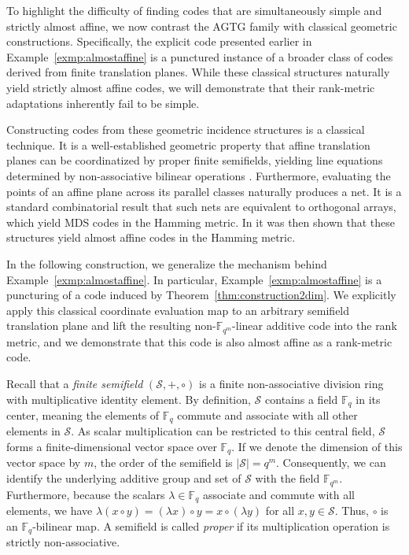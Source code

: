 \documentclass[a4paper,11pt,reqno]{article}
\newcommand{\F}{\mathbb{F}}
\renewcommand{\S}{\mathcal{S}}
\theoremstyle{plain} \numberwithin{equation}{section}
\theoremstyle{definition}
\begin{document}
To highlight the difficulty of finding codes that are simultaneously simple and strictly almost affine, we now contrast the AGTG family with classical geometric constructions. Specifically, the explicit code presented earlier in Example~\ref{exmp:almostaffine} is a punctured instance of a broader class of codes derived from finite translation planes. While these classical structures naturally yield strictly almost affine codes, we will demonstrate that their rank-metric adaptations inherently fail to be simple.

Constructing codes from these geometric incidence structures is a classical technique. It is a well-established geometric property that affine translation planes can be coordinatized by proper finite semifields, yielding line equations determined by non-associative bilinear operations \cite{projectiveplanes,Assmus_Key_1992}. Furthermore, evaluating the points of an affine plane across its parallel classes naturally produces a net. It is a standard combinatorial result that such nets are equivalent to orthogonal arrays, which yield MDS codes in the Hamming metric. In \cite{AlmostAffineCodes} it was then shown that these structures yield almost affine codes in the Hamming metric.

In the following construction, we generalize the mechanism behind Example~\ref{exmp:almostaffine}. In particular, Example~\ref{exmp:almostaffine} is a puncturing of a code induced by Theorem~\ref{thm:construction2dim}. We explicitly apply this classical coordinate evaluation map to an arbitrary semifield translation plane and lift the resulting non-$\F_{q^m}$-linear additive code into the rank metric, and we demonstrate that this code is also almost affine as a rank-metric code.

Recall that a \emph{finite semifield} $(\S,+,\circ)$ is a finite non-associative division ring with multiplicative identity element. By definition, $\S$ contains a field $\F_q$ in its center, meaning the elements of $\F_q$ commute and associate with all other elements in $\S$. As scalar multiplication can be restricted to this central field, $\S$ forms a finite-dimensional vector space over $\F_q$. If we denote the dimension of this vector space by $m$, the order of the semifield is $|\S| = q^m$. Consequently, we can identify the underlying additive group and set of $\S$ with the field $\F_{q^m}$. Furthermore, because the scalars $\lambda \in \F_q$ associate and commute with all elements, we have $\lambda (x\circ y) = (\lambda x)\circ y = x\circ (\lambda y)$ for all $x,y\in \S$. Thus, $\circ$ is an $\F_q$-bilinear map. A semifield is called \emph{proper} if its multiplication operation is strictly non-associative. 
\end{document}
